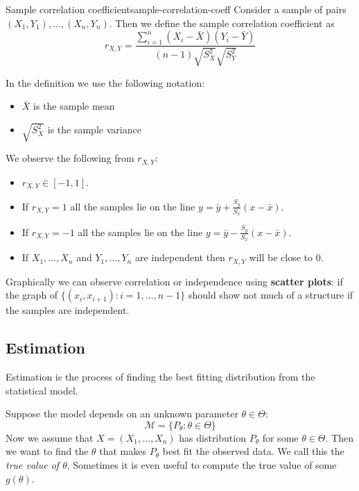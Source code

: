 \documentclass[12pt]{extarticle}
\begin{document}
\begin{definition}{Sample correlation coefficient}{sample-correlation-coeff}
	Consider a sample of pairs $(X_1, Y_1), \dots, (X_n, Y_n)$.
	Then we define the sample correlation coefficient as
	\begin{equation}
		r_{X, Y} = \frac{\sum^n_{i = 1} (X_i - \bar{X})(Y_i - \bar{Y})}{(n-1)\sqrt{S^2_X} \sqrt{S^2_Y}}
	\end{equation}
\end{definition}

In the definition we use the following notation:
\begin{itemize}
	\item $\bar X$ is the sample mean
	\item $\sqrt{S^2_X}$ is the sample variance
\end{itemize}

We observe the following from $r_{X, Y}$:
\begin{itemize}
	\item $r_{X, Y} \in [-1, 1]$.
	\item If $r_{X, Y} = 1$ all the samples lie on the line $y = \bar y + \frac{S_y}{S_x}(x-\bar x)$.
	\item If $r_{X, Y} = -1$ all the samples lie on the line $y = \bar y - \frac{S_y}{S_x}(x-\bar x)$.
	\item If $X_1, \dots, X_n$ and $Y_1, \dots, Y_n$ are independent then $r_{X, Y}$ will be close to $0$.
\end{itemize}

Graphically we can observe correlation or independence using \textbf{scatter plots}: if the graph of $\{ (x_i, x_{i+1}) : i = 1, \dots, n-1 \}$ should show not much of a structure if the samples are independent.

\subsection{Estimation}

Estimation is the process of finding the best fitting distribution from the statistical model.

Suppose the model depends on an unknown parameter $\theta \in \Theta$:
\begin{equation}
	\mathcal M = \{ P_\theta : \theta \in \Theta \}
\end{equation}
Now we assume that $X = (X_1, \dots, X_n)$ has distribution $P_\theta$ for some $\theta \in \Theta$.
Then we want to find the $\theta$ that makes $P_\theta$ best fit the observed data.
We call this the \emph{true value of $\theta$}.
Sometimes it is even useful to compute the true value of some $g(\theta)$.
\end{document}
